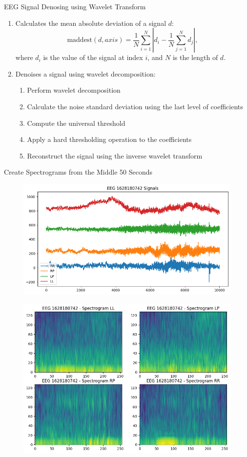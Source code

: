 \documentclass[leqno]{beamer}
\begin{document}
\begin{frame}{EEG Signal Denosing using Wavelet Transform}
\begin{enumerate}
\item Calculates the mean absolute deviation of a signal $d$:
\begin{equation*}
\mathrm{maddest}(d, axis) = \frac{1}{N} \sum_{i=1}^N
\left\vert d_i - \frac{1}{N} \sum_{j=1}^N d_j \right\vert,
\end{equation*}
where $d_i$ is the value of the signal at index $i$, and
$N$ is the length of $d$.
\item Denoises a signal using wavelet decomposition:
\begin{enumerate}
\item Perform wavelet decomposition
\item Calculate the noise standard deviation using the last level of
coefficients
\item Compute the universal threshold
\item Apply a hard thresholding operation to the coefficients
\item Reconstruct the signal using the inverse wavelet transform
\end{enumerate}
\end{enumerate}
\end{frame}


\begin{frame}{Create Spectrograms from the Middle 50 Seconds}
\begin{figure}[tbp]
\centering
\includegraphics[width=.4\textwidth]{EEG_Signal}
\end{figure}
\begin{figure}[tbp]
\centering
\includegraphics[width=.5\textwidth]{EEG_Spectrogram}
\end{figure}
\end{frame}
\end{document}
